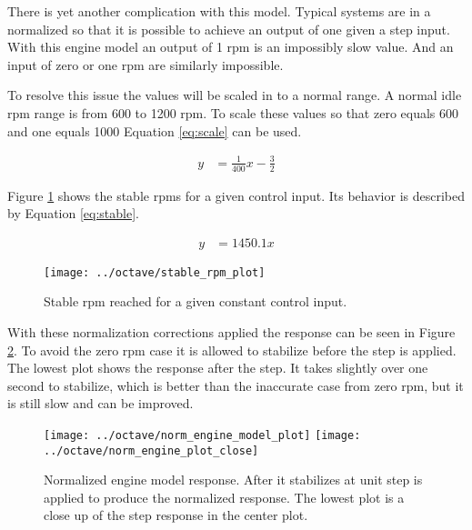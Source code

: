 \documentclass{article}
\begin{document}
There is yet another complication with this model.
Typical systems are in a normalized so that it is possible to
achieve an output of one given a step input.
With this engine model an output of 1 rpm is an impossibly slow value.
And an input of zero or one rpm are similarly impossible.

To resolve this issue the values will be scaled in to a normal range.
A normal idle rpm range is from 600 to 1200 rpm.
To scale these values so that zero equals 600 and one equals 1000
Equation \ref{eq:scale} can be used.

\begin{align}
	y &= \frac{1}{400}x - \frac{3}{2} \label{eq:scale}
\end{align}

Figure \ref{fig:stable} shows the stable rpms for a given control input.
Its behavior is described by Equation \ref{eq:stable}.

\begin{align}
	y &= 1450.1 x \label{eq:stable}
\end{align}

\begin{figure}[htbp!]
\begin{center}
\texttt{[image: ../octave/stable\_rpm\_plot]}
\end{center}
\caption{Stable rpm reached for a given constant control input.}
\label{fig:stable}
\end{figure}

With these normalization corrections applied the response can be
seen in Figure \ref{fig:normeng}.
To avoid the zero rpm case it is allowed to stabilize before the
step is applied.
The lowest plot shows the response after the step.
It takes slightly over one second to stabilize, which is better than
the inaccurate case from zero rpm, but it is still slow and can
be improved.

\begin{figure}
\begin{center}
\texttt{[image: ../octave/norm\_engine\_model\_plot]}
\texttt{[image: ../octave/norm\_engine\_plot\_close]}
\end{center}
\caption{Normalized engine model response.  After it stabilizes
at unit step is applied to produce the normalized response.
The lowest plot is a close up of the step response in the center
plot.}
\label{fig:normeng}
\end{figure}
\end{document}
